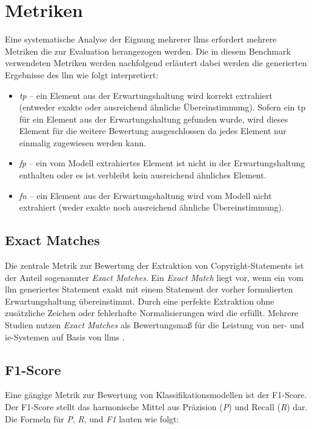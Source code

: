 
\section{Metriken}\label{sec:metriken-benchmark}

Eine systematische Analyse der Eignung mehrerer \glspl{llm} erfordert mehrere Metriken die zur Evaluation herangezogen werden.
Die in diesem Benchmark verwendeten Metriken werden nachfolgend erläutert dabei werden die generierten Ergebnisse des \gls{llm} wie folgt interpretiert:
\begin{itemize}
    \item \textit{\gls{tp}} -- ein Element aus der Erwartungshaltung wird korrekt extrahiert (entweder exakte oder ausreichend ähnliche Übereinstimmung). Sofern ein \gls{tp} für ein Element aus der Erwartungshaltung gefunden wurde, wird dieses Element für die weitere Bewertung ausgeschlossen da jedes Element nur einmalig zugewiesen werden kann.
    \item \textit{\gls{fp}} -- ein vom Modell extrahiertes Element ist nicht in der Erwartungshaltung enthalten oder es ist verbleibt kein ausreichend ähnliches Element.
    \item \textit{\gls{fn}} -- ein Element aus der Erwartungshaltung wird vom Modell nicht extrahiert (weder exakte noch ausreichend ähnliche Übereinstimmung).
\end{itemize}

\subsection{Exact Matches}
Die zentrale Metrik zur Bewertung der Extraktion von Copyright-Statements ist der Anteil sogenannter \textit{Exact Matches}.
Ein \textit{Exact Match} liegt vor, wenn ein vom \gls{llm} generiertes Statement exakt mit einem Statement der vorher formulierten Erwartungshaltung übereinstimmt.
Durch eine perfekte Extraktion ohne zusätzliche Zeichen oder fehlerhafte Normalisierungen wird die  erfüllt.
Mehrere Studien nutzen \textit{Exact Matches} als Bewertungsmaß für die Leistung von \gls{ner}- und \gls{ie}-Systemen auf Basis von \glspl{llm} \autocite{dunn_structured_2022}\autocite{hu_improving_2024}.

\subsection{F1-Score}
Eine gängige Metrik zur Bewertung von Klassifikationsmodellen ist der F1-Score\autocite{noauthor_f-score_2025}.
Der F1-Score stellt das harmonische Mittel aus Präzision (\textit{P}) und Recall (\textit{R}) dar.
Die Formeln für \textit{P}, \textit{R}, und \textit{F1} lauten wie folgt:

